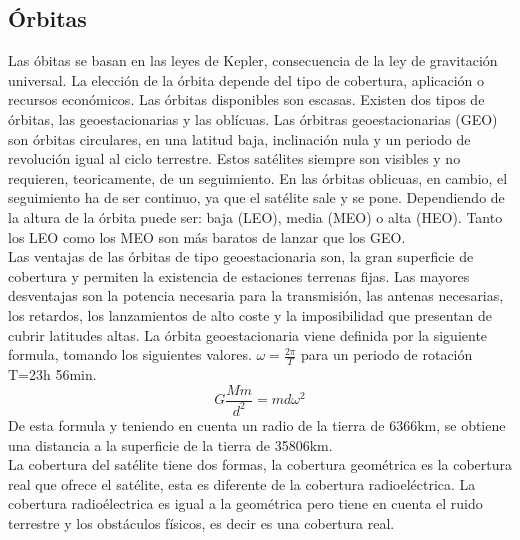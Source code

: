 	\subsection{Órbitas}
	\label{sub:orbitas}
		Las óbitas se basan en las leyes de Kepler, consecuencia de la ley de gravitación universal. La elección de la órbita depende del tipo de cobertura, aplicación o recursos económicos. Las órbitas disponibles son escasas. Existen dos tipos de órbitas, las geoestacionarias y las oblícuas. Las órbitras geoestacionarias (\acrshort{GEO}) son órbitas circulares, en una latitud baja, inclinación nula y un periodo de revolución igual al ciclo terrestre. Estos satélites siempre son visibles y no requieren, teoricamente, de un seguimiento. En las órbitas oblicuas, en cambio, el seguimiento ha de ser continuo, ya que el satélite sale y se pone. Dependiendo de la altura de la órbita puede ser: baja (\acrshort{LEO}), media (\acrshort{MEO}) o alta (\acrshort{HEO}). Tanto los \acrshort{LEO} como los \acrshort{MEO} son más baratos de lanzar que los \acrshort{GEO}.\\
		Las ventajas de las órbitas de tipo geoestacionaria son, la gran superficie de cobertura y permiten la existencia de estaciones terrenas fijas. Las mayores desventajas son la potencia necesaria para la transmisión, las antenas necesarias, los retardos, los lanzamientos de alto coste y la imposibilidad que presentan de cubrir latitudes altas.
		La órbita geoestacionaria viene definida por la siguiente formula, tomando los siguientes valores. $\omega=\frac{2\pi}{T}$ para un periodo de rotación T=23h 56min.
		\[G\frac{Mm}{d^2}=md\omega^2\]
		De esta formula y teniendo en cuenta un radio de la tierra de 6366km, se obtiene una distancia a la superficie de la tierra de 35806km.\\
		La cobertura del satélite tiene dos formas, la cobertura geométrica es la cobertura real que ofrece el satélite, esta es diferente de la cobertura radioeléctrica. La cobertura radioélectrica es igual a la geométrica pero tiene en cuenta el ruido terrestre y los obstáculos físicos, es decir es una cobertura real.
